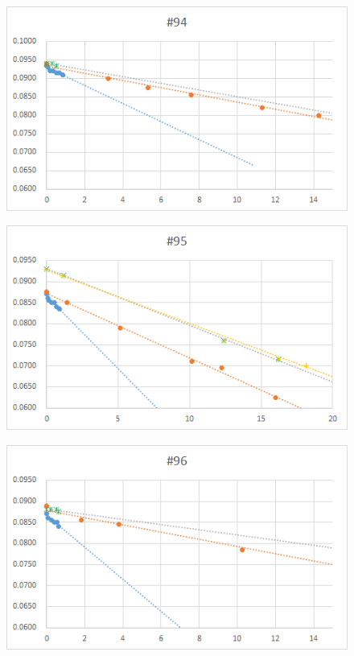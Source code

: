   \begin{figure}[htbp]
    \centering
       \includegraphics[width=120mm]{vol_094.png}
  \end{figure}
  \begin{figure}[htbp]
    \centering
       \includegraphics[width=120mm]{vol_095.png}
  \end{figure}
  \begin{figure}[htbp]
    \centering
       \includegraphics[width=120mm]{vol_096.png}
  \end{figure}
